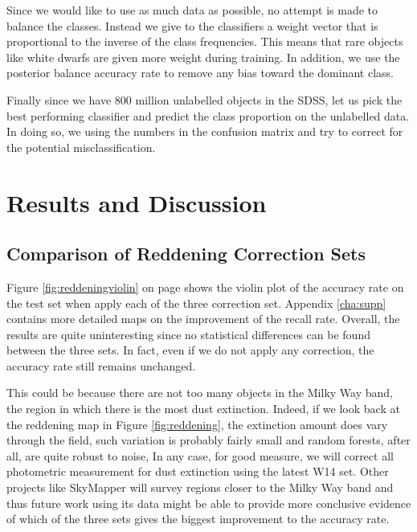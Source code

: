 Since we would like to use as much data as possible, no attempt is made to balance the classes.
Instead we give to the classifiers a weight vector that is proportional to the inverse
of the class frequencies. This means that rare objects like white dwarfs are given more
weight during training. In addition, we use the posterior balance accuracy rate to remove
any bias toward the dominant class.

Finally since we have 800 million unlabelled objects in the SDSS, let us pick the
best performing classifier and predict the class proportion on the unlabelled data.
In doing so, we using the numbers in the confusion matrix and try to correct for the
potential misclassification.

\section{Results and Discussion}
\label{sec:results1}

\subsection{Comparison of Reddening Correction Sets}
Figure \ref{fig:reddeningviolin} on page \pageref{fig:reddeningviolin} shows
the violin plot of the accuracy rate on the test
set when apply each of the three correction set. Appendix \ref{cha:supp} contains
more detailed maps on the improvement of the recall rate. Overall, the results are quite
uninteresting since no statistical differences can be found between the three sets. In fact,
even if we do not apply any correction, the accuracy rate still remains unchanged.

This could be because there are not too many objects in the Milky Way band,
the region in which there is the most dust extinction. Indeed, if we look back at the reddening map
in Figure \ref{fig:reddening}, the extinction amount does vary through the field, such 
variation is probably fairly small and random forests, after all, are quite robust to noise,
In any case, for good measure, we will correct all photometric measurement for dust
extinction using
the latest W14 set. Other projects like SkyMapper will survey regions closer to the Milky
Way band and thus future work using its data might be able to provide more conclusive
evidence of which of the three sets gives the biggest improvement to the accuracy rate.

